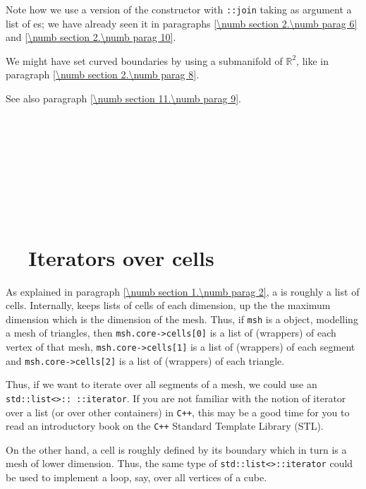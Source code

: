 Note how we use a version of the {\small\tt {}} constructor with {\small\tt {}::join}
taking as argument a list of {\small\tt {}}es; we have already seen it in paragraphs
\ref{\numb section 2.\numb parag 6} and \ref{\numb section 2.\numb parag 10}.

We might have set curved boundaries by using a submanifold of $ \mathbb{R}^2 $, like in paragraph
\ref{\numb section 2.\numb parag 8}.

See also paragraph \ref{\numb section 11.\numb parag 9}.


\section{~~\cinza{[empty]}}\label{\numb section 9.\numb parag 3}

\section{~~\cinza{[empty]}}\label{\numb section 9.\numb parag 4}


\section{~~Iterators over cells}\label{\numb section 9.\numb parag 5}

As explained in paragraph \ref{\numb section 1.\numb parag 2}, a {\small\tt {}} is
roughly a list of cells.
Internally, {\maniFEM} keeps lists of cells of each dimension, up the the maximum
dimension which is the dimension of the mesh.
Thus, if {\small\tt msh} is a {\small\tt {}} object, modelling a
mesh of triangles, then {\small\tt msh.core->cells[0]} is a list of (wrappers) of
each vertex of that mesh, {\small\tt msh.core->cells[1]} is a list of (wrappers) of
each segment and {\small\tt msh.core->cells[2]} is a list of (wrappers) of each triangle.

Thus, if we want to iterate over all segments of a mesh, we could use an
{\small\tt std::list<>:: ::iterator}.
If you are not familiar with the notion of iterator over a list (or over other containers)
in {\tt C++}, this may be a good time for you to read an introductory book on the
{\tt C++} Standard Template Library (STL).

On the other hand, a cell is roughly defined by its boundary which in turn is a mesh of
lower dimension.
Thus, the same type of {\small\tt std::list<>::iterator} could be used to
implement a loop, say, over all vertices of a cube.

